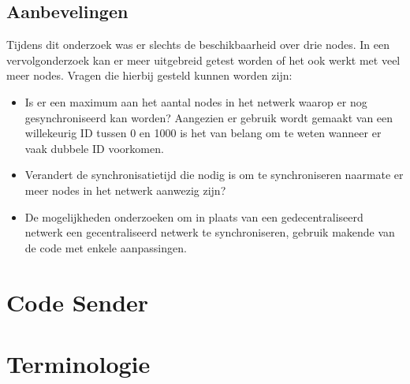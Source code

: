 \documentclass{article}
\begin{document}
\subsection{Aanbevelingen}
Tijdens dit onderzoek was er slechts de beschikbaarheid over drie nodes. In een vervolgonderzoek kan er meer uitgebreid getest worden of het ook werkt met veel meer nodes. Vragen die hierbij gesteld kunnen worden zijn:
\begin{itemize}
	\item Is er een maximum aan het aantal nodes in het netwerk waarop er nog gesynchroniseerd kan worden? Aangezien er gebruik wordt gemaakt van een willekeurig ID tussen 0 en 1000 is het van belang om te weten wanneer er vaak dubbele ID voorkomen. 
	\item Verandert de synchronisatietijd die nodig is om te synchroniseren naarmate er meer nodes in het netwerk aanwezig zijn?
	\item De mogelijkheden onderzoeken om in plaats van een gedecentraliseerd netwerk een gecentraliseerd netwerk te synchroniseren, gebruik makende van de code met enkele aanpassingen. 
\end{itemize}
\newpage





\clearpage
\appendix
{}
\section{Code Sender}

\newpage

\section{Terminologie}
\end{document}
